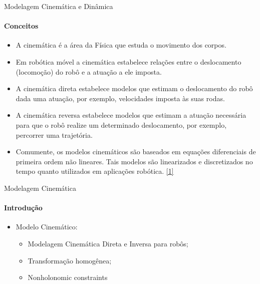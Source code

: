 \documentclass{beamer}
\begin{document}
\begin{frame}{Modelagem Cinemática e Dinâmica}
    \framesubtitle{Conceitos}
    \begin{itemize}
        \item A cinemática é a área da Física que estuda o movimento dos corpos.
        \item Em robótica móvel a cinemática estabelece relações entre o deslocamento
        (locomoção) do robô e a atuação a ele imposta.
        \item A cinemática direta estabelece modelos que estimam o deslocamento do robô
        dada uma atuação, por exemplo, velocidades imposta às suas rodas.
        \item A cinemática reversa estabelece modelos que estimam a atuação necessária
        para que o robô realize um determinado deslocamento, por exemplo, percorrer
        uma trajetória.
        \item Comumente, os modelos cinemáticos são baseados em equações diferenciais
        de primeira ordem não lineares. Tais modelos são linearizados e discretizados
        no tempo quanto utilizados em aplicações robótica. \href{http://143.106.148.168:9080/Cursos/IA368N/01-16/cinematica2.pdf}{[1]}
    \end{itemize}
\end{frame}


\begin{frame}{Modelagem Cinemática}
    \framesubtitle{Introdução}
    \setlength\extrarowheight{5pt}
    \begin{itemize}
        \item Modelo Cinemático:
        \begin{itemize}
            \item Modelagem Cinemática Direta e Inversa para robôs;
            \item Transformação homogênea;
            \item Nonholonomic constraints
        \end{itemize}
    \end{itemize}
\end{frame}
\end{document}
